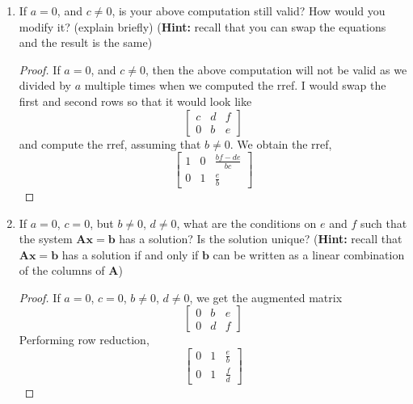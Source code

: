 \documentclass[11pt]{scrartcl}
\begin{document}
\begin{enumerate}[label=\alph*.]
{\begin{proof}
		      \[x =
			      \begin{bmatrix}
				      \frac{de-bf}{ad-cb} \\
				      \frac{af-ce}{ad-cb}
			      \end{bmatrix} \quad \text{ where } ad-cb \neq 0
		      \]
	      \end{proof}
	      }
	\item{
	      If $a = 0$, and $c\neq 0$, is your above computation still valid?
	      How would you modify it? (explain briefly)
	      (\textbf{Hint:} recall that you can swap the equations and the result is the same)
	      \begin{proof}
		      If $a = 0$, and $c\neq 0$, then the above computation will not be valid as we
		      divided by $a$ multiple times when we computed the rref. I would swap the first
		      and second rows so that it would look like
		      \[
			      \left[\begin{array}{cc|c}
					      c & d & f \\
					      0 & b & e
				      \end{array}\right]
		      \]
		      and compute the rref, assuming that $b\neq0$. We obtain the rref,
		      \[
			      \left[\begin{array}{cc|c}
					      1 & 0 & \frac{bf-de}{bc} \\
					      0 & 1 & \frac{e}{b}
				      \end{array}\right]
		      \]
	      \end{proof}
	      }
	\item{
	      If $a = 0$, $c=0$, but $b \neq 0$, $d \neq 0$,
	      what are the conditions on $e$ and $f$ such that the system $\mathbf{Ax=b}$ has a solution?
	      Is the solution unique?  (\textbf{Hint:} recall that $\mathbf{Ax = b}$ has a solution if and only if
	      $\mathbf{b}$ can be written as a linear combination of the columns of $\mathbf{A}$)
	      \begin{proof}
		      If $a = 0$, $c=0$, $b \neq 0$, $d \neq 0$, we get the augmented matrix
		      \[
			      \left[\begin{array}{cc|c}
					      0 & b & e \\
					      0 & d & f
				      \end{array}\right]
		      \]
		      Performing row reduction,
		      \[
			      \left[\begin{array}{cc|c}
					      0 & 1 & \frac{e}{b} \\
					      0 & 1 & \frac{f}{d}
				      \end{array}\right]
\]
\end{proof}}
\end{enumerate}
\end{document}
